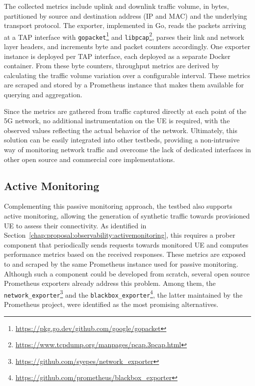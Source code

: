 The collected metrics include uplink and downlink traffic volume, in bytes, partitioned by source and destination address (\acs{IP} and \acs{MAC}) and the underlying transport protocol. The exporter, implemented in Go, reads the packets arriving at a \acs{TAP} interface with \texttt{gopacket}\footnote{\url{https://pkg.go.dev/github.com/google/gopacket}} and \texttt{libpcap}\footnote{\url{https://www.tcpdump.org/manpages/pcap.3pcap.html}}, parses their link and network layer headers, and increments byte and packet counters accordingly. One exporter instance is deployed per \acs{TAP} interface, each deployed as a separate Docker container. From these byte counters, throughput metrics are derived by calculating the traffic volume variation over a configurable interval. These metrics are scraped and stored by a Prometheus instance that makes them available for querying and aggregation.

Since the metrics are gathered from traffic captured directly at each point of the \acs{5G} network, no additional instrumentation on the \acs{UE} is required, with the observed values reflecting the actual behavior of the network. Ultimately, this solution can be easily integrated into other testbeds, providing a non-intrusive way of monitoring network traffic and overcome the lack of dedicated interfaces in other open source and commercial core implementations.

\subsection{Active Monitoring}
\label{chap:impl:observability:active}

Complementing this passive monitoring approach, the testbed also supports active monitoring, allowing the generation of synthetic traffic towards provisioned \acs{UE} to assess their connectivity. As identified in Section~\ref{chap:proposal:observability:activemonitoring}, this requires a prober component that periodically sends requests towards monitored \acs{UE} and computes performance metrics based on the received responses. These metrics are exposed to and scraped by the same Prometheus instance used for passive monitoring. Although such a component could be developed from scratch, several open source Prometheus exporters already address this problem. Among them, the \texttt{network\_exporter}\footnote{\url{https://github.com/syepes/network_exporter}} and the \texttt{blackbox\_exporter}\footnote{\url{https://github.com/prometheus/blackbox_exporter}}, the latter maintained by the Prometheus project, were identified as the most promising alternatives.

